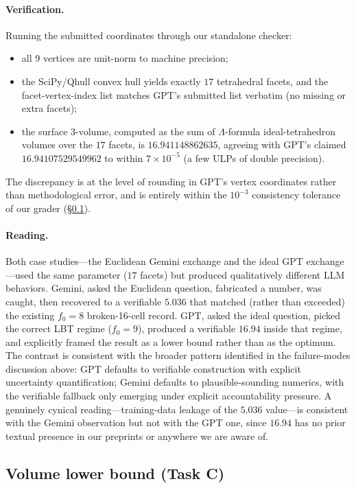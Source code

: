 \documentclass[11pt]{article}
\begin{document}
\paragraph{Verification.}
Running the submitted coordinates through our standalone checker:
\begin{itemize}
\item all 9 vertices are unit-norm to machine precision;
\item the SciPy/Qhull convex hull yields exactly $17$ tetrahedral
      facets, and the facet-vertex-index list matches GPT's
      submitted list verbatim (no missing or extra facets);
\item the surface 3-volume, computed as the sum of
      $\Lambda$-formula ideal-tetrahedron volumes over the
      $17$ facets, is $16.941148862635$, agreeing with GPT's
      claimed $16.94107529549962$ to within $7 \times 10^{-5}$
      (a few ULPs of double precision).
\end{itemize}
The discrepancy is at the level of rounding in GPT's vertex
coordinates rather than methodological error, and is entirely
within the $10^{-3}$ consistency tolerance of our grader
(\S\ref{sec:volume-lb-results}).

\paragraph{Reading.}
Both case studies---the Euclidean Gemini exchange and the ideal
GPT exchange---used the same parameter ($17$ facets) but produced
qualitatively different LLM behaviors.  Gemini, asked the
Euclidean question, fabricated a number, was caught, then
recovered to a verifiable $5.036$ that matched (rather than
exceeded) the existing $f_0 = 8$ broken-16-cell record.  GPT,
asked the ideal question, picked the correct LBT regime
($f_0 = 9$), produced a verifiable $16.94$ inside that regime,
and explicitly framed the result as a lower bound rather than as
the optimum.  The contrast is consistent with the broader pattern
identified in the failure-modes discussion above: GPT defaults to
verifiable
construction with explicit uncertainty quantification; Gemini
defaults to plausible-sounding numerics, with the verifiable
fallback only emerging under explicit accountability pressure.
A genuinely cynical reading---training-data leakage of the
$5.036$ value---is consistent with the Gemini observation but
not with the GPT one, since $16.94$ has no prior textual presence
in our preprints or anywhere we are aware of.

\subsection{Volume lower bound (Task C)}
\label{sec:volume-lb-results}
\end{document}
